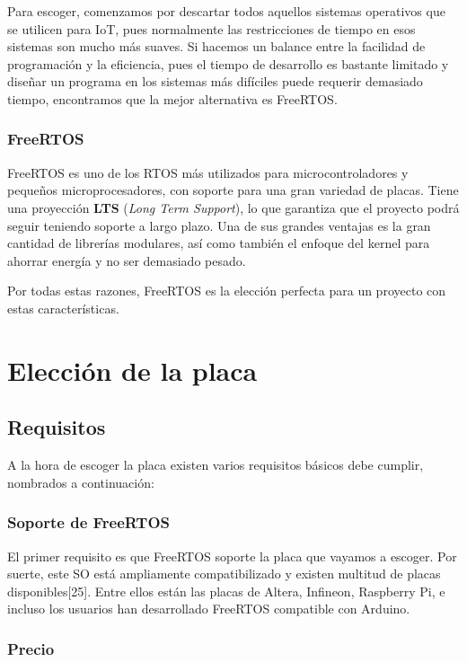Para escoger, comenzamos por descartar todos aquellos sistemas operativos que se utilicen para IoT, pues normalmente las restricciones de tiempo en esos sistemas son mucho más suaves. Si hacemos un balance entre la facilidad de programación y la eficiencia, pues el tiempo de desarrollo es bastante limitado y diseñar un programa en los sistemas más difíciles puede requerir demasiado tiempo, encontramos que la mejor alternativa es FreeRTOS. 

\subsubsection*{FreeRTOS}

FreeRTOS es uno de los RTOS más utilizados para microcontroladores y pequeños microprocesadores, con soporte para una gran variedad de placas. Tiene una proyección \textbf{LTS} (\textit{Long Term Support}), lo que garantiza que el proyecto podrá seguir teniendo soporte a largo plazo. Una de sus grandes ventajas es la gran cantidad de librerías modulares, así como también el enfoque del kernel para ahorrar energía y no ser demasiado pesado. 

Por todas estas razones, FreeRTOS es la elección perfecta para un proyecto con estas características. 

\section{Elección de la placa}
\subsection{Requisitos}
A la hora de escoger la placa existen varios requisitos básicos debe cumplir, nombrados a continuación: 

\subsubsection*{Soporte de FreeRTOS}

El primer requisito es que FreeRTOS soporte la placa que vayamos a escoger. Por suerte, este SO está ampliamente compatibilizado y existen multitud de placas disponibles[25]. Entre ellos están las placas de Altera, Infineon, Raspberry Pi, e incluso los usuarios han desarrollado FreeRTOS compatible con Arduino.

\subsubsection*{Precio}

